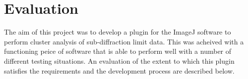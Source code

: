 
\part{Evaluation}
\label{prt:evaluation}

The aim of this project was to develop a plugin for the ImageJ software to
perform cluster analysis of sub-diffraction limit data. This was acheived with
a functioning peice of software that is able to perform well with a number of
different testing situations. An evaluation of the extent to which this plugin
satisfies the requirements and the development process are described below.
